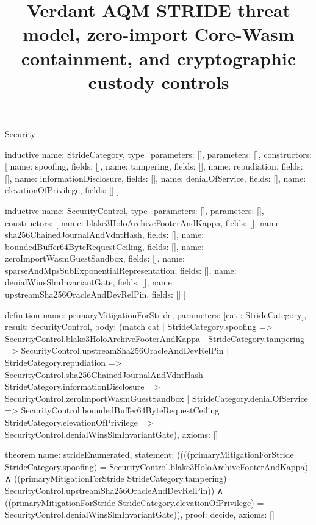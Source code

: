 \begin{lexlean}{Security}
\title{Verdant AQM STRIDE threat model, zero-import Core-Wasm containment, and cryptographic custody controls}

\begin{semanticmodule}

inductive{
  name: StrideCategory,
  type_parameters: [],
  parameters: [],
  constructors: [
    {name: spoofing, fields: []},
    {name: tampering, fields: []},
    {name: repudiation, fields: []},
    {name: informationDisclosure, fields: []},
    {name: denialOfService, fields: []},
    {name: elevationOfPrivilege, fields: []}
  ]
}

inductive{
  name: SecurityControl,
  type_parameters: [],
  parameters: [],
  constructors: [
    {name: blake3HoloArchiveFooterAndKappa, fields: []},
    {name: sha256ChainedJournalAndVdntHash, fields: []},
    {name: boundedBuffer64ByteRequestCeiling, fields: []},
    {name: zeroImportWasmGuestSandbox, fields: []},
    {name: sparseAndMpsSubExponentialRepresentation, fields: []},
    {name: denialWinsSlmInvariantGate, fields: []},
    {name: upstreamSha256OracleAndDevRelPin, fields: []}
  ]
}

definition{
  name: primaryMitigationForStride,
  parameters: [cat : StrideCategory],
  result: SecurityControl,
  body: (match cat
    | StrideCategory.spoofing => SecurityControl.blake3HoloArchiveFooterAndKappa
    | StrideCategory.tampering => SecurityControl.upstreamSha256OracleAndDevRelPin
    | StrideCategory.repudiation => SecurityControl.sha256ChainedJournalAndVdntHash
    | StrideCategory.informationDisclosure => SecurityControl.zeroImportWasmGuestSandbox
    | StrideCategory.denialOfService => SecurityControl.boundedBuffer64ByteRequestCeiling
    | StrideCategory.elevationOfPrivilege => SecurityControl.denialWinsSlmInvariantGate),
  axioms: []
}

theorem{
  name: strideEnumerated,
  statement: ((((primaryMitigationForStride StrideCategory.spoofing)
      = SecurityControl.blake3HoloArchiveFooterAndKappa)
    ∧ ((primaryMitigationForStride StrideCategory.tampering)
      = SecurityControl.upstreamSha256OracleAndDevRelPin))
    ∧ ((primaryMitigationForStride StrideCategory.elevationOfPrivilege)
      = SecurityControl.denialWinsSlmInvariantGate)),
  proof: decide{},
  axioms: []
}

\end{semanticmodule}
\end{lexlean}
